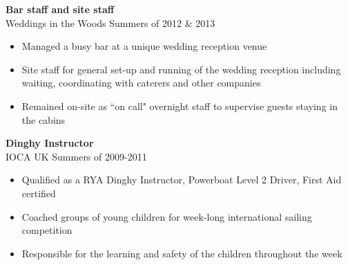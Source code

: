 \documentclass[margin, line, 10pt]{res} %
\begin{document}
\begin{resume}
\textbf{Bar staff and site staff} \\
Weddings in the Woods \hfill Summers of 2012 \& 2013 \\
\begin{itemize} 
\item Managed a busy bar at a unique wedding reception venue
\item Site staff for general set-up and running of the wedding reception including waiting, coordinating with caterers and other companies
\item Remained on-site as ``on call" overnight staff to supervise guests staying in the cabins    
\end{itemize} 

\textbf{Dinghy Instructor} \\
IOCA UK \hfill Summers of 2009-2011 \\
\begin{itemize} 
\item Qualified as a RYA Dinghy Instructor, Powerboat Level 2 Driver, First Aid certified
\item Coached groups of young children for week-long international sailing competition 
\item Responsible for the learning and safety of the children throughout the week
\end{itemize} 


\end{resume}
\end{document}
